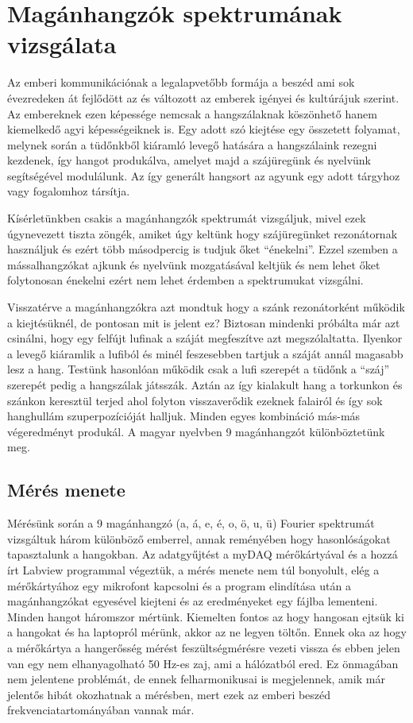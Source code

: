 \documentclass[a4paper,12pt]{article}
\begin{document}
\section{Magánhangzók spektrumának vizsgálata}

Az emberi kommunikációnak a legalapvetőbb formája a beszéd ami sok évezredeken át fejlődött az és változott az emberek igényei és kultúrájuk szerint. Az embereknek ezen képessége nemcsak a hangszálaknak köszönhető hanem kiemelkedő agyi képességeiknek is. Egy adott szó kiejtése egy összetett folyamat, melynek során a tüdőnkből kiáramló levegő hatására a hangszálaink rezegni kezdenek, így hangot produkálva, amelyet majd a szájüregünk és nyelvünk segítségével modulálunk. Az így generált hangsort az agyunk egy adott tárgyhoz vagy fogalomhoz társítja.

Kísérletünkben csakis a magánhangzók spektrumát vizsgáljuk, mivel ezek úgynevezett tiszta zöngék, amiket úgy keltünk hogy szájüregünket rezonátornak használjuk és ezért több másodpercig is tudjuk őket ``énekelni''. Ezzel szemben a mássalhangzókat ajkunk és nyelvünk mozgatásával keltjük és nem lehet őket folytonosan énekelni ezért nem lehet érdemben a spektrumukat vizsgálni.

Visszatérve a magánhangzókra azt mondtuk hogy a szánk rezonátorként működik a kiejtésüknél, de pontosan mit is jelent ez? Biztosan mindenki próbálta már azt csinálni, hogy egy felfújt lufinak a száját megfeszítve azt megszólaltatta. Ilyenkor a levegő kiáramlik a lufiból és minél feszesebben tartjuk a száját annál magasabb lesz a hang. Testünk hasonlóan működik csak a lufi szerepét a tüdőnk a ``száj'' szerepét pedig a hangszálak játsszák. Aztán az így kialakult hang a torkunkon és szánkon keresztül terjed ahol folyton visszaverődik ezeknek falairól és így sok hanghullám szuperpozícióját halljuk. Minden egyes kombináció más-más végeredményt produkál. A magyar nyelvben 9 magánhangzót különböztetünk meg.

\subsection{Mérés menete}

Mérésünk során a 9 magánhangzó (a, á, e, é, o, ö, u, ü) Fourier spektrumát vizsgáltuk három különböző emberrel, annak reményében hogy hasonlóságokat tapasztalunk a hangokban. Az adatgyűjtést a myDAQ mérőkártyával és a hozzá írt Labview programmal végeztük, a mérés menete nem túl bonyolult, elég a mérőkártyához egy mikrofont kapcsolni és a program elindítása után a magánhangzókat egyesével kiejteni és az eredményeket egy fájlba lementeni. Minden hangot háromszor mértünk. Kiemelten fontos az hogy hangosan ejtsük ki a hangokat és ha laptopról mérünk, akkor az ne legyen töltőn. Ennek oka az hogy a mérőkártya a hangerősség mérést feszültségmérésre vezeti vissza és ebben jelen van egy nem elhanyagolható 50 Hz-es zaj, ami a hálózatból ered. Ez önmagában nem jelentene problémát, de ennek felharmonikusai is megjelennek, amik már jelentős hibát okozhatnak a mérésben, mert ezek az emberi beszéd frekvenciatartományában vannak már.
\end{document}
